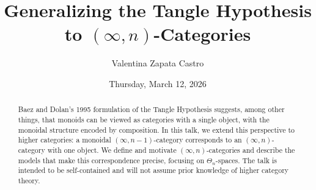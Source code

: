 \documentclass{UAmathtalk}
\author{Valentina Zapata Castro}
\title{Generalizing the Tangle Hypothesis to \texorpdfstring{$(\infty,n)$}{(∞,n)}-Categories}
\date{Thursday, March 12, 2026}
\begin{document}
\maketitle

\begin{abstract}
Baez and Dolan’s 1995 formulation of the Tangle Hypothesis suggests, among other things, that monoids can be viewed as categories with a single object, with the monoidal structure encoded by composition. In this talk, we extend this perspective to higher categories: a monoidal \mbox{$(\infty,n-1)$-category} corresponds to an $(\infty,n)$-category with one object. We define and motivate $(\infty,n)$-categories and describe the models that make this correspondence precise, focusing on $\Theta_n$-spaces. The talk is intended to be self-contained and will not assume prior knowledge of higher category theory.
\end{abstract}
\end{document}
